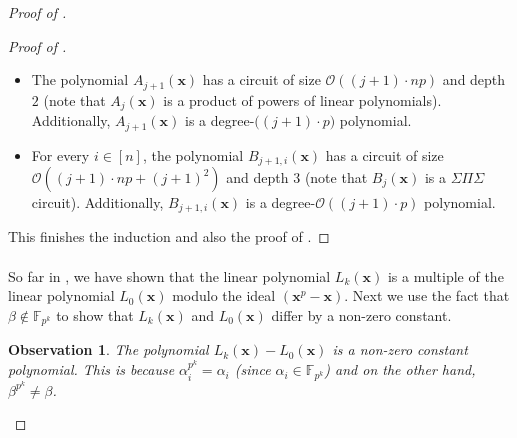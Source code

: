 \documentclass[11pt]{article}
\newtheorem{observation}[theorem]{Observation}
\newcommand{\bigO}{\mathcal{O}}
\newcommand{\F}{\mathbb{F}}
\begin{document}
\begin{proof}[Proof of ]
\begin{proof}[Proof of ]
\begin{itemize}
    \item The polynomial $A_{j+1}(\mathbf{x})$ has a circuit of size $\bigO((j+1) \cdot np)$ and depth $2$ (note that $A_{j}(\mathbf{x})$ is a product of powers of linear polynomials). Additionally, $A_{j+1}(\mathbf{x})$ is a degree-$\big((j+1) \cdot p)$ polynomial.
    \item For every $i \in [n]$, the polynomial $B_{j+1,i}(\mathbf{x})$ has a circuit of size $\bigO((j+1) \cdot np + (j+1)^{2})$ and depth $3$ (note that $B_{j}(\mathbf{x})$ is a $\Sigma \Pi \Sigma$ circuit). Additionally, $B_{j+1,i}(\mathbf{x})$ is a degree-$\bigO((j+1) \cdot p)$ polynomial.
\end{itemize}
This finishes the induction and also the proof of .
\end{proof}

\paragraph{}So far in , we have shown that the linear polynomial $L_{k}(\mathbf{x})$ is a multiple of the linear polynomial $L_{0}(\mathbf{x})$ modulo the ideal $(\mathbf{x}^{p} - \mathbf{x})$. Next we use the fact that $\beta \notin \F_{p^{k}}$ to show that $L_{k}(\mathbf{x})$ and $L_{0}(\mathbf{x})$ differ by a non-zero constant.
\begin{observation}
The polynomial $L_{k}(\mathbf{x}) - L_{0}(\mathbf{x})$ is a \emph{non-zero constant} polynomial. This is because $\alpha_{i}^{p^{k}} = \alpha_{i}$ (since $\alpha_{i} \in \F_{p^{k}}$) and on the other hand, $\beta^{p^{k}} \neq \beta$. 
\end{observation}


\end{proof}
\end{document}
